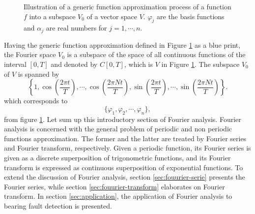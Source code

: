 \documentclass[../Main/thesis.tex]{subfiles}
\begin{document}
\begin{figure}[H]
\begin{center}
\end{center}
\caption{Illustration of a generic function approximation process of a function $f$ into a subspace $V_{0}$ of a vector space $V$. $\varphi_{j}$ are the basis functions and $\alpha_{j}$ are real numbers for $j=1,\cdots,n$.}
\label{figure:il}
\end{figure}

\justify
Having the generic function approximation defined in Figure \ref{figure:il} as a blue print, the Fourier space $V_{0}$ is a subspace of the space of all continuous functions of the interval $[0, T]$ and denoted by $C[0,T] $, which is $V$ in Figure \ref{figure:il}. The subspace $V_{0}$ of $V$ is spanned by 
\begin{equation}
\left\{1, \cos\left( \frac{2\pi t}{T} \right), \cdots,\cos\left( \frac{2\pi Nt}{T} \right), \sin\left( \frac{2\pi t}{T} \right), \cdots,\sin\left( \frac{2\pi Nt}{T} \right)   \right\}. \nonumber
\end{equation}
which corresponds to
\begin{equation}
\{\varphi_{1}, \varphi_{2}, \cdots, \varphi_{n}\}, \nonumber
\end{equation}
from figure \ref{figure:il}. 
\justify
Let sum up this introductory section of Fourier analysis. Fourier analysis is concerned with the general problem of periodic and non periodic functions approximation. The former and the latter are treated by Fourier series and Fourier transform, respectively. Given a periodic function, its Fourier series is given as a discrete superposition of trigonometric functions, and its Fourier transform is expressed as continuous superposition of exponential functions.
To extend the discussion of Fourier analysis, section \ref{sec:fouurier-serie} presents the Fourier series, while section \ref{sec:fouurier-transform} elaborates on Fourier transform. In section \ref{sec:application}, the application of Fourier analysis to bearing fault detection is presented.
\end{document}
